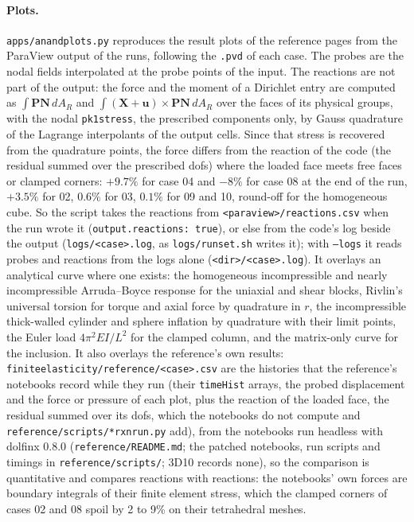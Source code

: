 \documentclass[11pt]{article}
\newcommand{\bX}{\bm{X}}
\newcommand{\bu}{\bm{u}}
\newcommand{\bN}{\bm{N}}
\newcommand{\bP}{\bm{P}}
\DeclareRobustCommand{\code}[1]{{\def\_{\textunderscore\allowbreak}\texttt{#1}}}
\DeclareRobustCommand{\file}[1]{{\def\_{\textunderscore\allowbreak}\texttt{#1}}}
\begin{document}
\paragraph{Plots.}
\file{apps/anand\_plots.py} reproduces the result plots of the reference
pages from the ParaView output of the runs, following the \file{.pvd} of each
case. The probes are the nodal fields interpolated at the probe points of the
input. The reactions are not part of the output: the force and the moment of
a Dirichlet entry are computed as
$\int \bP\bN\,dA_R$ and
$\int (\bX + \bu) \times \bP\bN\,dA_R$ over the
faces of its physical groups, with the nodal \code{pk1\_stress}, the
prescribed components only, by Gauss quadrature of the Lagrange interpolants
of the output cells. Since that stress is recovered from the quadrature
points, the force differs from the reaction of the code (the residual summed
over the prescribed dofs) where the loaded face meets free faces or clamped
corners: $+9.7\%$ for case 04 and $-8\%$ for case 08 at the end of the run,
$+3.5\%$ for 02, $0.6\%$ for 03, $0.1\%$ for 09 and 10, round-off for the
homogeneous cube.  So the script takes the reactions from
\file{<paraview>/reactions.csv} when the run wrote it
(\code{output.reactions: true}), or else from the code's log beside the
output (\file{logs/<case>.log}, as \file{logs/run\_set.sh} writes it); with \code{--logs} it reads probes and
reactions from the logs alone (\file{<dir>/<case>.log}). It overlays an analytical curve where one exists:
the homogeneous incompressible and nearly incompressible Arruda--Boyce
response for the uniaxial and shear blocks, Rivlin's universal torsion for torque and
axial force by quadrature in $r$, the incompressible thick-walled cylinder
and sphere inflation by quadrature with their limit points, the Euler load
$4\pi^2EI/L^2$ for the clamped column, and the matrix-only curve for the
inclusion.  It also overlays the reference's own results:
\file{finite\_elasticity/reference/<case>.csv} are the histories that the
reference's notebooks record while they run (their \code{timeHist} arrays,
the probed displacement and the force or pressure of each plot, plus the
reaction of the loaded face, the residual summed over its dofs, which the
notebooks do not compute and \file{reference/scripts/*\_rxn\_run.py} add),
from the notebooks run headless with dolfinx 0.8.0
(\file{reference/README.md}; the patched notebooks, run scripts and timings
in \file{reference/scripts/}; 3D10 records none), so the comparison is
quantitative and compares reactions with reactions: the notebooks' own
forces are boundary integrals of their finite element stress, which the
clamped corners of cases 02 and 08 spoil by 2 to 9\% on their tetrahedral
meshes.
\end{document}
